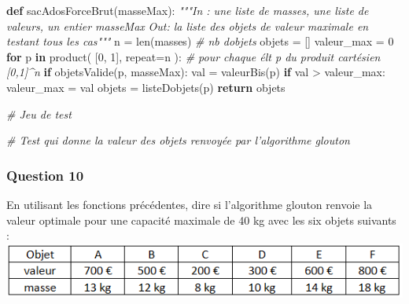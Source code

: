 \documentclass[
  paper=a4,
  ,captions=tableheading
]{scrartcl}
\newenvironment{Shaded}{}{}
\newcommand{\BuiltInTok}[1]{\textcolor[rgb]{0.00,0.50,0.00}{#1}}
\newcommand{\CommentTok}[1]{\textcolor[rgb]{0.38,0.63,0.69}{\textit{#1}}}
\newcommand{\ControlFlowTok}[1]{\textcolor[rgb]{0.00,0.44,0.13}{\textbf{#1}}}
\newcommand{\DecValTok}[1]{\textcolor[rgb]{0.25,0.63,0.44}{#1}}
\newcommand{\KeywordTok}[1]{\textcolor[rgb]{0.00,0.44,0.13}{\textbf{#1}}}
\newcommand{\NormalTok}[1]{#1}
\newcommand{\OperatorTok}[1]{\textcolor[rgb]{0.40,0.40,0.40}{#1}}
\begin{document}
\begin{Shaded}
\begin{Highlighting}[]
\KeywordTok{def}\NormalTok{ sacAdosForceBrut(masseMax):}
    \CommentTok{"""In : une liste de masses, une liste de valeurs, un entier masseMax}
\CommentTok{    Out: la liste des objets de valeur maximale en testant tous les cas"""}
\NormalTok{    n }\OperatorTok{=} \BuiltInTok{len}\NormalTok{(masses)  }\CommentTok{\# nb d\textquotesingle{}objets}
\NormalTok{    objets }\OperatorTok{=}\NormalTok{ []}
\NormalTok{    valeur\_max }\OperatorTok{=} \DecValTok{0}
    \ControlFlowTok{for}\NormalTok{ p }\KeywordTok{in}\NormalTok{ product(}
\NormalTok{        [}\DecValTok{0}\NormalTok{, }\DecValTok{1}\NormalTok{], repeat}\OperatorTok{=}\NormalTok{n}
\NormalTok{    ):  }\CommentTok{\# pour chaque élt p du produit cartésien [0,1]\^{}n}
        \ControlFlowTok{if}\NormalTok{ objetsValide(p, masseMax):}
\NormalTok{            val }\OperatorTok{=}\NormalTok{ valeurBis(p)}
            \ControlFlowTok{if}\NormalTok{ val }\OperatorTok{\textgreater{}}\NormalTok{ valeur\_max:}
\NormalTok{                valeur\_max }\OperatorTok{=}\NormalTok{ val}
\NormalTok{                objets }\OperatorTok{=}\NormalTok{ listeDobjets(p)}
    \ControlFlowTok{return}\NormalTok{ objets}
\end{Highlighting}
\end{Shaded}

\begin{Shaded}
\begin{Highlighting}[]
\CommentTok{\# Jeu de test}
\end{Highlighting}
\end{Shaded}

\begin{Shaded}
\begin{Highlighting}[]
\CommentTok{\# Test qui donne la valeur des objets renvoyée par l’algorithme glouton}
\end{Highlighting}
\end{Shaded}

\hypertarget{question-10}{%
\subsubsection{Question 10}\label{question-10}}

En utilisant les fonctions précédentes, dire si l'algorithme glouton
renvoie la valeur optimale pour une capacité maximale de 40 kg avec les
six objets suivants :\\
\includegraphics{images/4-image.png}
\end{document}
